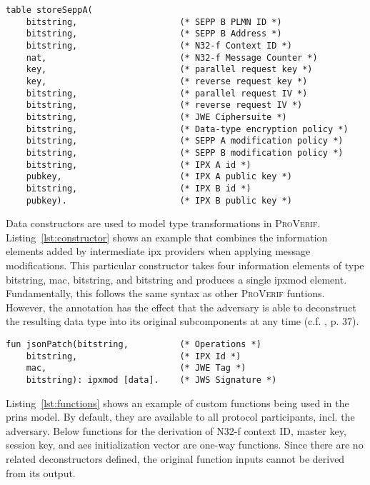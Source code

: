 \begin{lstlisting}[caption={Declaration of local SEPP storage using tables},label={lst:tables},firstnumber=32]
table storeSeppA(
    bitstring,                    (* SEPP B PLMN ID *)
    bitstring,                    (* SEPP B Address *)
    bitstring,                    (* N32-f Context ID *)
    nat,                          (* N32-f Message Counter *)
    key,                          (* parallel request key *)
    key,                          (* reverse request key *)
    bitstring,                    (* parallel request IV *)
    bitstring,                    (* reverse request IV *)
    bitstring,                    (* JWE Ciphersuite *)
    bitstring,                    (* Data-type encryption policy *)
    bitstring,                    (* SEPP A modification policy *)
    bitstring,                    (* SEPP B modification policy *)
    bitstring,                    (* IPX A id *)
    pubkey,                       (* IPX A public key *)
    bitstring,                    (* IPX B id *)
    pubkey).                      (* IPX B public key *)
\end{lstlisting}

Data constructors are used to model type transformations in \textsc{ProVerif}.
Listing~\ref{lst:constructor} shows an example that combines the information elements added by intermediate \gls{ipx} providers when applying message modifications.
This particular constructor takes four information elements of type {\sffamily bitstring}, {\sffamily mac}, {\sffamily bitstring}, and {\sffamily bitstring} and produces a single {\sffamily ipxmod} element.
Fundamentally, this follows the same syntax as other \textsc{ProVerif} funtions.
However, the {\sffamily [data]} annotation has the effect that the adversary is able to deconstruct the resulting data type into its original subcomponents at any time (c.f. \cite{blanchet2020proverif}, p. 37).

\begin{lstlisting}[caption={Definition of custom data constructor},label={lst:constructor},firstnumber=75]
fun jsonPatch(bitstring,          (* Operations *)
    bitstring,                    (* IPX Id *)
    mac,                          (* JWE Tag *)
    bitstring): ipxmod [data].    (* JWS Signature *)
\end{lstlisting}

Listing~\ref{lst:functions} shows an example of custom functions being used in the \gls{prins} model.
By default, they are available to all protocol participants, incl. the adversary.
Below functions for the derivation of N32-f context ID, master key, session key, and \gls{aes} initialization vector are one-way functions.
Since there are no related deconstructors defined, the original function inputs cannot be derived from its output.

